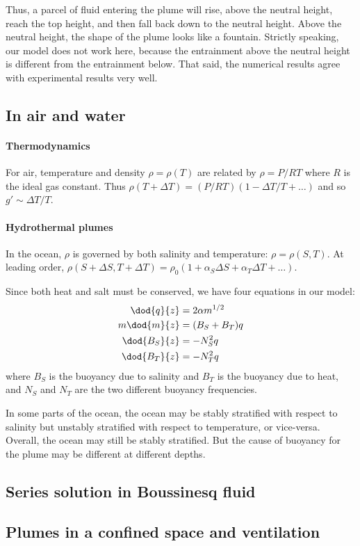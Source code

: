 Thus, a parcel of fluid entering the plume will rise, above the neutral height,
reach the top height, and then fall back down to the neutral height. Above the
neutral height, the shape of the plume looks like a fountain. Strictly speaking,
our model does not work here, because the entrainment above the neutral height
is different from the entrainment below. That said, the numerical results agree
with experimental results very well.

\subsection{In air and water}

\paragraph{Thermodynamics} For air, temperature and density $\rho = \rho(T)$ are
related by $\rho = P/RT$ where $R$ is the ideal gas constant. Thus
$\rho(T+\Delta T) = (P/RT) (1-\Delta T/T+\dots)$ and so $g' \sim \Delta T/T$. 

\paragraph{Hydrothermal plumes} In the ocean, $\rho$ is governed by both
salinity and temperature: $\rho = \rho(S,T)$. At leading order, $\rho(S+\Delta
S, T+\Delta T) = \rho_0 (1+\alpha_S \Delta S + \alpha_T \Delta T + \dots)$.

Since both heat and salt must be conserved, we have four equations in our model:
\begin{align}
    \dod{q}{z} &= 2\alpha m^{1/2} \\
    m\dod{m}{z} &= (B_S + B_T) q \\
    \dod{B_S}{z} &= -N_S^2 q \\
    \dod{B_T}{z} &= -N_T^2 q
\end{align}
where $B_S$ is the buoyancy due to salinity and $B_T$ is the buoyancy due to
heat, and $N_S$ and $N_T$ are the two different buoyancy frequencies.

In some parts of the ocean, the ocean may be stably stratified with respect to
salinity but unstably stratified with respect to temperature, or vice-versa.
Overall, the ocean may still be stably stratified. But the cause of buoyancy for
the plume may be different at different depths.

\subsection{Series solution in Boussinesq fluid}

\subsection{Plumes in a confined space and ventilation}



